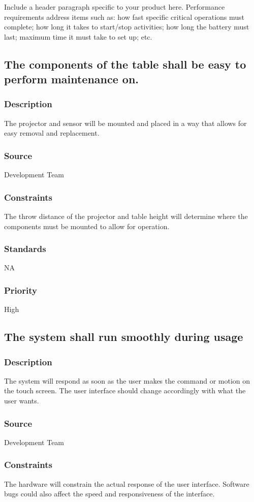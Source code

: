 Include a header paragraph specific to your product here. Performance requirements address items such as: how fast specific critical operations must complete; how long it takes to start/stop activities; how long the battery must last; maximum time it must take to set up; etc.

\subsection{The components of the table shall be easy to perform maintenance on. }
\subsubsection{Description}
The projector and sensor will be mounted and placed in a way that allows for easy removal and replacement.
\subsubsection{Source}
Development Team
\subsubsection{Constraints}
The throw distance of the projector and table height will determine where the components must be mounted to allow for operation. 
\subsubsection{Standards}
NA
\subsubsection{Priority}
High

\subsection{The system shall run smoothly during usage }
\subsubsection{Description}
The system will respond as soon as the user makes the command or motion on the touch screen. The user interface should change accordingly with what the user wants.
\subsubsection{Source}
Development Team
\subsubsection{Constraints}
The hardware will constrain the actual response of the user interface. Software bugs could also affect the speed and responsiveness of the interface.
